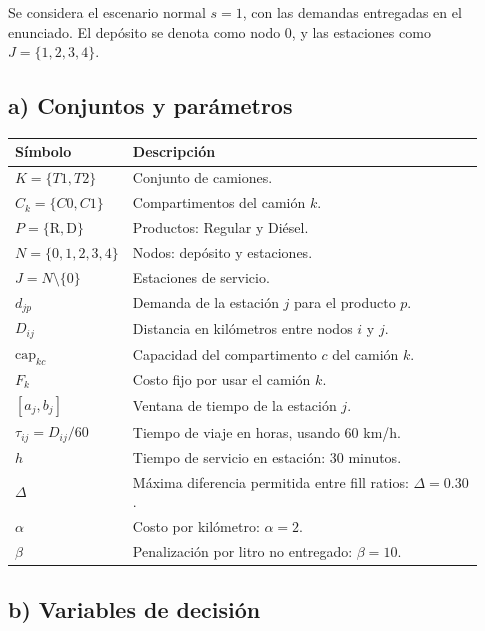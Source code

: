 \documentclass[11pt,letterpaper]{article}
\newcommand{\R}{\mathrm{R}}
\newcommand{\D}{\mathrm{D}}
\begin{document}
Se considera el escenario normal \(s=1\), con las demandas entregadas en el enunciado.
El depósito se denota como nodo \(0\), y las estaciones como \(J=\{1,2,3,4\}\).

\subsection{a) Conjuntos y parámetros}

\begin{longtable}{p{0.18\linewidth}p{0.75\linewidth}}
\toprule
\textbf{Símbolo} & \textbf{Descripción} \\
\midrule
\endhead
\(K=\{T1,T2\}\) & Conjunto de camiones. \\
\(C_k=\{C0,C1\}\) & Compartimentos del camión \(k\). \\
\(P=\{\R,\D\}\) & Productos: Regular y Diésel. \\
\(N=\{0,1,2,3,4\}\) & Nodos: depósito y estaciones. \\
\(J=N\setminus\{0\}\) & Estaciones de servicio. \\
\(d_{jp}\) & Demanda de la estación \(j\) para el producto \(p\). \\
\(D_{ij}\) & Distancia en kilómetros entre nodos \(i\) y \(j\). \\
\(\mathrm{cap}_{kc}\) & Capacidad del compartimento \(c\) del camión \(k\). \\
\(F_k\) & Costo fijo por usar el camión \(k\). \\
\([a_j,b_j]\) & Ventana de tiempo de la estación \(j\). \\
\(\tau_{ij}=D_{ij}/60\) & Tiempo de viaje en horas, usando 60 km/h. \\
\(h\) & Tiempo de servicio en estación: 30 minutos. \\
\(\Delta\) & Máxima diferencia permitida entre fill ratios: \(\Delta=0.30\). \\
\(\alpha\) & Costo por kilómetro: \(\alpha=2\). \\
\(\beta\) & Penalización por litro no entregado: \(\beta=10\). \\
\bottomrule
\end{longtable}

\subsection{b) Variables de decisión}
\end{document}
